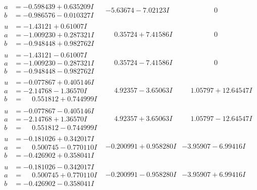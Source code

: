 \documentclass[1p]{elsarticle_modified}
\theoremstyle{definition}
\begin{document}
$$\begin{array}{c|c|c}
\begin{aligned}
a &= -0.598439 + 0.635209 I \\
b &= -0.986576 - 0.010327 I\end{aligned}
 & -5.63674 - 7.02123 I & \phantom{-0.000000 } 0 \\ \hline\begin{aligned}
u &= -1.43121 + 0.61007 I \\
a &= -1.009230 + 0.287321 I \\
b &= -0.948448 + 0.982762 I\end{aligned}
 & \phantom{-}0.35724 + 7.41586 I & \phantom{-0.000000 } 0 \\ \hline\begin{aligned}
u &= -1.43121 - 0.61007 I \\
a &= -1.009230 - 0.287321 I \\
b &= -0.948448 - 0.982762 I\end{aligned}
 & \phantom{-}0.35724 - 7.41586 I & \phantom{-0.000000 } 0 \\ \hline\begin{aligned}
u &= -0.077867 + 0.405146 I \\
a &= -2.14768 - 1.36570 I \\
b &= \phantom{-}0.551812 + 0.744999 I\end{aligned}
 & \phantom{-}4.92357 - 3.65063 I & \phantom{-}1.05797 + 12.64547 I \\ \hline\begin{aligned}
u &= -0.077867 - 0.405146 I \\
a &= -2.14768 + 1.36570 I \\
b &= \phantom{-}0.551812 - 0.744999 I\end{aligned}
 & \phantom{-}4.92357 + 3.65063 I & \phantom{-}1.05797 - 12.64547 I \\ \hline\begin{aligned}
u &= -0.181026 + 0.342017 I \\
a &= \phantom{-}0.500745 - 0.770110 I \\
b &= -0.426902 + 0.358041 I\end{aligned}
 & -0.200991 + 0.958280 I & -3.95907 - 6.99416 I \\ \hline\begin{aligned}
u &= -0.181026 - 0.342017 I \\
a &= \phantom{-}0.500745 + 0.770110 I \\
b &= -0.426902 - 0.358041 I\end{aligned}
 & -0.200991 - 0.958280 I & -3.95907 + 6.99416 I \\ \hline\begin{aligned}

\end{aligned}
\end{array}$$
\end{document}
